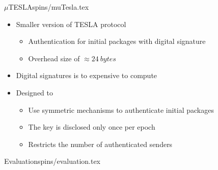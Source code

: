 \begin{notedFrame}{$\mu$TESLA}{spins/muTesla.tex}
    \begin{itemize}
        \item Smaller version of TESLA protocol
        \begin{itemize}
            \item Authentication for initial packages with digital signature
            \item Overhead size of $\approx 24 \: bytes$
        \end{itemize}
        \item Digital signatures is to expensive to compute
        \item Designed to
        \begin{itemize}
            \item Use symmetric mechanisms to authenticate initial packages
            \item The key is disclosed only once per epoch
            \item Restricts the number of authenticated senders
        \end{itemize}
    \end{itemize}
\end{notedFrame}

\begin{notedFrame}{Evaluation}{spins/evaluation.tex}
    \begin{columns}[T, onlytextwidth]
            
    \end{columns}
\end{notedFrame}